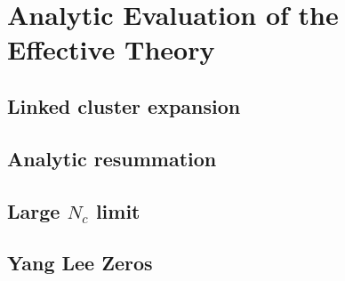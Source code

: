 \chapter{Analytic Evaluation of the Effective Theory}

\section{Linked cluster expansion}
\section{Analytic resummation}
\section{Large \texorpdfstring{$N_c$}{Nc} limit}
\section{Yang Lee Zeros}
